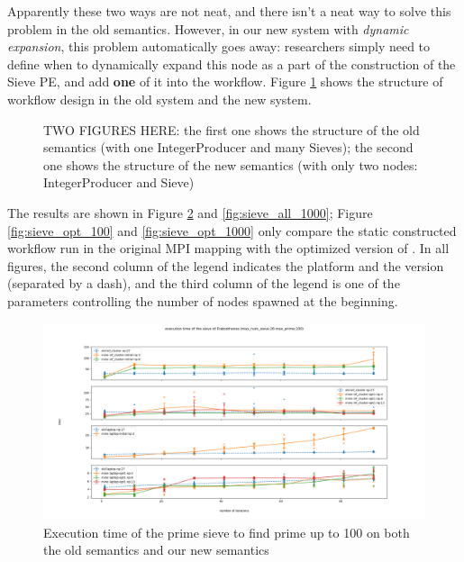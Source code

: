 Apparently these two ways are not neat, and there isn't a neat way to solve this problem in the old semantics. However, in our new system with \emph{dynamic expansion}, this problem automatically goes away: researchers simply need to define when to dynamically expand this node as a part of the construction of the Sieve PE, and add \textbf{one} of it into the workflow. Figure \ref{fig:comp_old_new_sieve} shows the structure of workflow design in the old system and the new system.

\begin{figure}[h]
\caption{
TWO FIGURES HERE:
the first one shows the structure of the old semantics (with one IntegerProducer and many Sieves);
	the second one shows the structure of the new semantics (with only two nodes: IntegerProducer and Sieve)
}
	\label{fig:comp_old_new_sieve}
\end{figure}

The results are shown in Figure \ref{fig:sieve_all_100} and \ref{fig:sieve_all_1000}; Figure \ref{fig:sieve_opt_100} and \ref{fig:sieve_opt_1000} only compare the static constructed workflow run in the original MPI mapping with the optimized version of \tdynexp. In all figures, the second column of the legend indicates the platform and the version (separated by a dash), and the third column of the legend is one of the parameters controlling the number of nodes spawned at the beginning.

\begin{figure}[h]
\centering
    \includegraphics[width=1\textwidth]{figures/sieve_all_100}
\caption{Execution time of the prime sieve to find prime up to 100 on both the old semantics and our new semantics}
\label{fig:sieve_all_100}
\end{figure}

